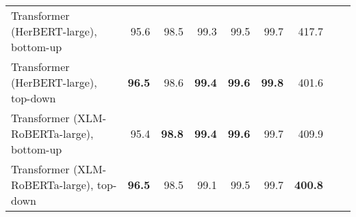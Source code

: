 \begin{table}[ht!]
{\begin{tabular}{lrrrrrrrr}
  Transformer (HerBERT-large), bottom-up & 95.6 & 98.5 & 99.3 & 99.5 & 99.7 & 417.7 \\ 
  Transformer (HerBERT-large), top-down & \textbf{96.5} & 98.6 & \textbf{99.4} & \textbf{99.6} & \textbf{99.8} & 401.6 \\ 
  Transformer (XLM-RoBERTa-large), bottom-up & 95.4 & \textbf{98.8} & \textbf{99.4} & \textbf{99.6} & 99.7 & 409.9 \\ 
  Transformer (XLM-RoBERTa-large), top-down & \textbf{96.5} & 98.5 & 99.1 & 99.5 & 99.7 & \textbf{400.8} \\ 
   \hline
\end{tabular}
}
\end{table}




